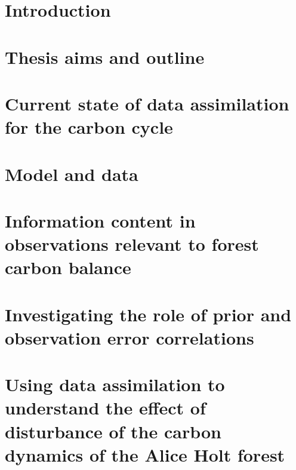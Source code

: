 





\tableofcontents


\chapter{Introduction}
\label{chap:intro}


\chapter{Thesis aims and outline}
\label{chap:aims}


\chapter{Current state of data assimilation for the carbon cycle}
\label{chap:litrev}


\chapter{Model and data}
\label{chap:data}


\chapter{Information content in observations relevant to forest carbon balance}
\label{chap:info_con}


\chapter{Investigating the role of prior and observation error correlations}
\label{chap:error_corrs}


\chapter{Using data assimilation to understand the effect of disturbance of the carbon dynamics of the Alice Holt forest}
\label{chap:disturbance}


